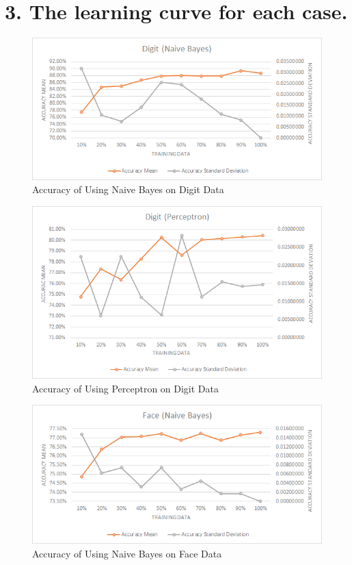 \documentclass[11pt]{article}
\begin{document}
	\section*{3. The learning curve for each case.}
		\begin{figure}[H]
			\centering
			\includegraphics[scale=0.8]{Accuracy Digit (Naive Bayes).jpg}
			\caption{Accuracy of Using Naive Bayes on Digit Data}\label{fig:1}
		\end{figure}
		\begin{figure}[H]
			\centering
			\includegraphics[scale=0.8]{Accuracy Digit (Perceptron).jpg}
			\caption{Accuracy of Using Perceptron on Digit Data}\label{fig:1}
		\end{figure}
		\begin{figure}[H]
			\centering
			\includegraphics[scale=0.8]{Accuracy Face (Naive Bayes).jpg}
			\caption{Accuracy of Using Naive Bayes on Face Data}\label{fig:1}
		\end{figure}
\end{document}
